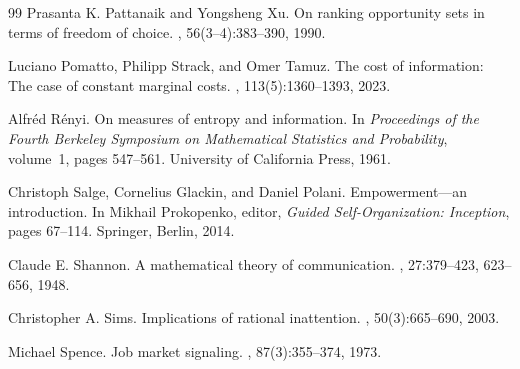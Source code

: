 \documentclass[11pt,a4paper]{article}
\theoremstyle{definition}
\newcommand{\1}{\mathbf 1}
\begin{document}
\begin{thebibliography}{99}
Prasanta K. Pattanaik and Yongsheng Xu.
\newblock On ranking opportunity sets in terms of freedom of choice.
, 56(3--4):383--390, 1990.

Luciano Pomatto, Philipp Strack, and Omer Tamuz.
\newblock The cost of information: The case of constant marginal costs.
, 113(5):1360--1393, 2023.

Alfr\'ed R\'enyi.
\newblock On measures of entropy and information.
\newblock In {\em Proceedings of the Fourth Berkeley Symposium on Mathematical Statistics and Probability}, volume~1,
  pages 547--561. University of California Press, 1961.

Christoph Salge, Cornelius Glackin, and Daniel Polani.
\newblock Empowerment---an introduction.
\newblock In Mikhail Prokopenko, editor, {\em Guided Self-Organization: Inception}, pages 67--114. Springer, Berlin,
  2014.

Claude E. Shannon.
\newblock A mathematical theory of communication.
, 27:379--423, 623--656, 1948.

Christopher A. Sims.
\newblock Implications of rational inattention.
, 50(3):665--690, 2003.

Michael Spence.
\newblock Job market signaling.
, 87(3):355--374, 1973.

\end{thebibliography}
\end{document}
